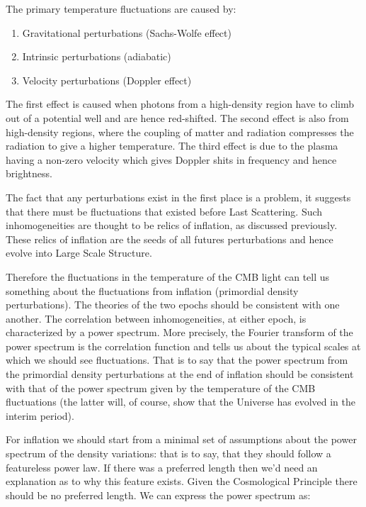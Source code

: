 The primary temperature fluctuations are caused by:

\begin{enumerate}
\item Gravitational perturbations (Sachs-Wolfe effect) 
\item Intrinsic perturbations (adiabatic)
\item Velocity perturbations (Doppler effect)
\end{enumerate}

The first effect is caused when photons from a high-density region have to climb out of a potential well and are hence red-shifted. The second effect is also from high-density regions, where the coupling of matter and radiation compresses the radiation to give a higher temperature. The third effect is due to the plasma having a non-zero velocity which gives Doppler shits in frequency and hence brightness.

The fact that any perturbations exist in the first place is a problem, it suggests that there must be fluctuations that existed before Last Scattering. Such inhomogeneities are thought to be relics of inflation, as discussed previously. These relics of inflation are the seeds of all futures perturbations and hence evolve into Large Scale Structure.

Therefore the fluctuations in the temperature of the CMB light can tell us something about the fluctuations from inflation (primordial density perturbations). The theories of the two epochs should be consistent with one another. The correlation between inhomogeneities, at either epoch, is characterized by a power spectrum. More precisely, the Fourier transform of the power spectrum is the correlation function and tells us about the typical scales at which we should see fluctuations. That is to say that the power spectrum from the primordial density perturbations at the end of inflation should be consistent with that of the power spectrum given by the temperature of the CMB fluctuations (the latter will, of course, show that the Universe has evolved in the interim period).

For inflation we should start from a minimal set of assumptions about the power spectrum of the density variations: that is to say, that they should follow a featureless power law. If there was a preferred length then we'd need an explanation as to why this feature exists. Given the Cosmological Principle there should be no preferred length. We can express the power spectrum as:

